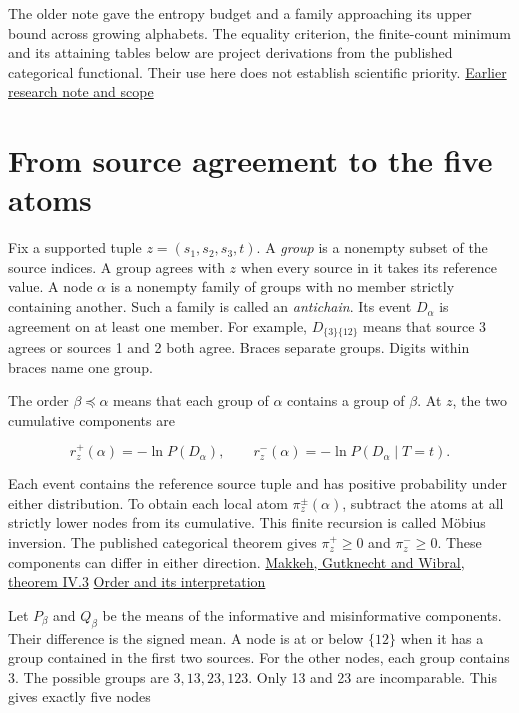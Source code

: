 The older note gave the entropy budget and a family approaching its upper bound across growing alphabets. The equality criterion, the finite-count minimum and its attaining tables below are project derivations from the published categorical functional. Their use here does not establish scientific priority. \href{https://github.com/sepahead/pid-rs/blob/main/audit/archive/shared-exclusions-research-findings-20261001/ARCHIVE.md}{Earlier research note and scope}

\clearpage

\section{From source agreement to the five atoms}\label{from-source-agreement-to-the-five-atoms}

Fix a supported tuple \(z=(s_1,s_2,s_3,t)\). A \emph{group} is a nonempty subset of the source indices. A group agrees with \(z\) when every source in it takes its reference value. A node \(\alpha\) is a nonempty family of groups with no member strictly containing another. Such a family is called an \emph{antichain}. Its event \(D_\alpha\) is agreement on at least one member. For example, \(D_{\{3\}\{12\}}\) means that source 3 agrees or sources 1 and 2 both agree. Braces separate groups. Digits within braces name one group.

The order \(\beta\preceq\alpha\) means that each group of \(\alpha\) contains a group of \(\beta\). At \(z\), the two cumulative components are

\[
r_z^+(\alpha)=-\ln P(D_\alpha),\qquad
r_z^-(\alpha)=-\ln P(D_\alpha\mid T=t).
\]

Each event contains the reference source tuple and has positive probability under either distribution. To obtain each local atom \(\pi_z^\pm(\alpha)\), subtract the atoms at all strictly lower nodes from its cumulative. This finite recursion is called Möbius inversion. The published categorical theorem gives \(\pi_z^+\geq0\) and \(\pi_z^-\geq0\). These components can differ in either direction. \href{https://doi.org/10.1103/PhysRevE.103.032149}{Makkeh, Gutknecht and Wibral, theorem IV.3} \href{https://arxiv.org/abs/2008.09535v2}{Order and its interpretation}

Let \(P_\beta\) and \(Q_\beta\) be the means of the informative and misinformative components. Their difference is the signed mean. A node is at or below \(\{12\}\) when it has a group contained in the first two sources. For the other nodes, each group contains 3. The possible groups are \(3,13,23,123\). Only 13 and 23 are incomparable. This gives exactly five nodes

